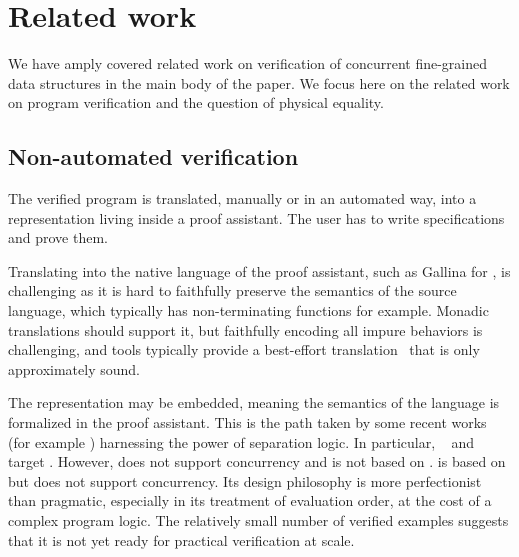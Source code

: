 \section{Related work}
\label{sec:related}

We have amply covered related work on verification of concurrent fine-grained data structures in the main body of the paper. We focus here on the related work on program verification and the question of physical equality.

\subsection{Non-automated verification}

The verified program is translated, manually or in an automated way, into a representation living inside a proof assistant.
The user has to write specifications and prove them.

Translating into the native language of the proof assistant, such as Gallina for \Rocq, is challenging as it is hard to faithfully preserve the semantics of the source language, which typically has non-terminating functions for example. Monadic translations should support it, but faithfully encoding all impure behaviors is challenging, and tools typically provide a best-effort translation~\citep{coq-of-ocaml,DBLP:conf/cpp/Spector-Zabusky18} that is only approximately sound.

The representation may be embedded, meaning the semantics of the language is formalized in the proof assistant.
This is the path taken by some recent works (for example \citet{DBLP:journals/pacmpl/GondelmanHPTB23}) harnessing the power of separation logic.
In particular, \CFML~\citep{DBLP:books/hal/Chargueraud23} and \Osiris~\citep{SeassauYMP25} target \OCaml.
However, \CFML does not support concurrency and is not based on \Iris.
\Osiris is based on \Iris but does not support concurrency.
Its design philosophy is more perfectionist than pragmatic, especially in its treatment of evaluation order, at the cost of a complex program logic.
The relatively small number of verified examples suggests that it is not yet ready for practical verification at scale.


